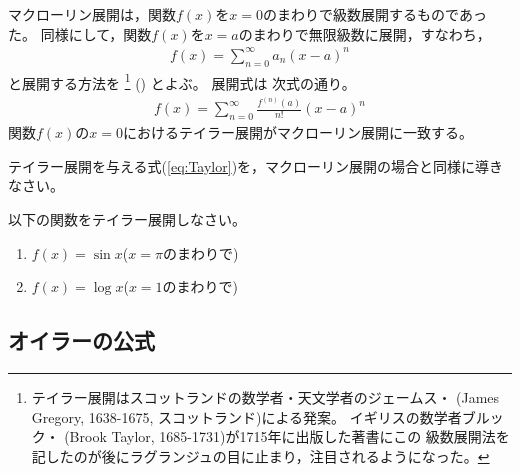 \documentclass[twocolumn,11pt]{jarticle}
\begin{document}
マクローリン展開は，関数$f(x)$を$x=0$のまわりで級数展開するものであった。
同様にして，関数$f(x)$を$x=a$のまわりで無限級数に展開，すなわち，
\begin{align*}
	f(x)=\sum_{n=0}^{\infty}a_n(x-a)^n
\end{align*}
と展開する方法を
\footnote{
テイラー展開はスコットランドの数学者・天文学者のジェームス・
(James Gregory, 1638-1675, スコットランド)による発案。
イギリスの数学者ブルック・
(Brook Taylor, 1685-1731)が1715年に出版した著書にこの
級数展開法を記したのが後にラグランジュの目に止まり，注目されるようになった。
}
()
とよぶ。
展開式は 次式の通り。
\begin{align}
  f(x)=\sum_{n=0}^{\infty}\frac{f^{(n)}(a)}{n!}(x-a)^n
  \label{eq:Taylor}
\end{align}
関数$f(x)$の$x=0$におけるテイラー展開がマクローリン展開に一致する。

\nquestion
テイラー展開を与える式(\ref{eq:Taylor})を，マクローリン展開の場合と同様に導きなさい。

\exercise
以下の関数をテイラー展開しなさい。
\begin{enumerate}
\item $f(x)=\sin x$\quad($x=\pi$のまわりで)
\item $f(x)=\log x$\quad($x=1$のまわりで)
\end{enumerate}

\subsection{オイラーの公式}
\end{document}
